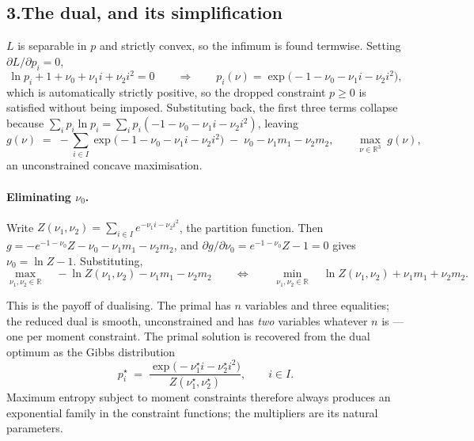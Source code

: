 \documentclass[11pt]{article}
\DeclareMathOperator*{\minimize}{min}
\DeclareMathOperator*{\maximize}{max}
\newcommand{\R}{\mathbb{R}}
\theoremstyle{definition}
\begin{document}
\subsection*{3.\quad The dual, and its simplification}

$L$ is separable in $p$ and strictly convex, so the infimum is found
termwise. Setting $\partial L / \partial p_i = 0$,
\[
  \ln p_i + 1 + \nu_0 + \nu_1 i + \nu_2 i^2 = 0
  \qquad\Longrightarrow\qquad
  p_i(\nu) = \exp\!\bigl(-1 - \nu_0 - \nu_1 i - \nu_2 i^2\bigr),
\]
which is automatically strictly positive, so the dropped constraint
$p \ge 0$ is satisfied without being imposed. Substituting back, the
first three terms collapse because
$\sum_i p_i \ln p_i = \sum_i p_i(-1-\nu_0-\nu_1 i - \nu_2 i^2)$, leaving
\begin{equation}\label{eq:p1dual}
  g(\nu) \;=\; -\sum_{i \in I}
      \exp\!\bigl(-1-\nu_0-\nu_1 i-\nu_2 i^2\bigr)
      \;-\; \nu_0 - \nu_1 m_1 - \nu_2 m_2 ,
  \qquad
  \maximize_{\nu \in \R^3} \; g(\nu),
\end{equation}
an unconstrained concave maximisation.

\paragraph{Eliminating $\nu_0$.} Write
$Z(\nu_1,\nu_2) = \sum_{i \in I} e^{-\nu_1 i - \nu_2 i^2}$, the
partition function. Then
$g = -e^{-1-\nu_0}Z - \nu_0 - \nu_1 m_1 - \nu_2 m_2$, and
$\partial g/\partial \nu_0 = e^{-1-\nu_0}Z - 1 = 0$ gives
$\nu_0 = \ln Z - 1$. Substituting,
\begin{equation}\label{eq:p1dualred}
  \maximize_{\nu_1,\nu_2 \in \R}\quad
  -\ln Z(\nu_1,\nu_2) - \nu_1 m_1 - \nu_2 m_2
  \qquad\Longleftrightarrow\qquad
  \minimize_{\nu_1,\nu_2 \in \R}\quad
  \ln Z(\nu_1,\nu_2) + \nu_1 m_1 + \nu_2 m_2 .
\end{equation}

This is the payoff of dualising. The primal has $n$ variables and three
equalities; the reduced dual is smooth, unconstrained and has
\emph{two} variables whatever $n$ is --- one per moment constraint. The
primal solution is recovered from the dual optimum as the Gibbs
distribution
\begin{equation}\label{eq:p1gibbs}
  p_i^\star \;=\;
  \frac{\exp\!\bigl(-\nu_1^\star i - \nu_2^\star i^2\bigr)}
       {Z(\nu_1^\star,\nu_2^\star)}, \qquad i \in I .
\end{equation}
Maximum entropy subject to moment constraints therefore always produces
an exponential family in the constraint functions; the multipliers are
its natural parameters.
\end{document}
